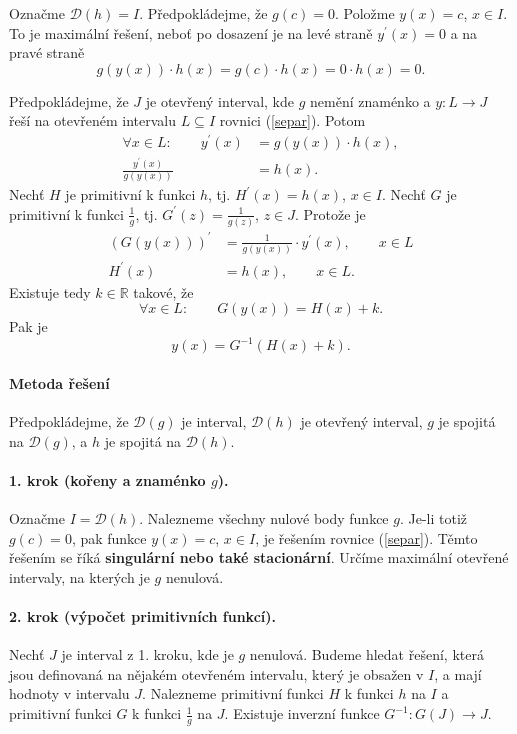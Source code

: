 \begin{pozorovani}
Označme $\mathcal D(h)=I$.
	Předpokládejme, že $g(c)=0$. Položme $y(x)=c$, $x \in I$. To je maximální řešení, neboť
	po dosazení je na levé straně $y^\prime(x)=0$ a na pravé straně
	$$
	    g(y(x))\cdot h(x) = g(c)\cdot h(x) = 0\cdot h(x)=0.
	$$
\end{pozorovani}

\begin{pozorovani}
Předpokládejme, že $J$ je otevřený interval, kde $g$ nemění znaménko a $y: L \to J$ řeší na otevřeném
	intervalu $L\subseteq I$ rovnici (\ref{separ}). Potom
	\begin{align*}
	\forall x \in L: \qquad y^\prime (x) &= g(y(x))\cdot h(x),\\
	\frac{y^\prime(x)}{g(y(x))}&= h(x).
	\end{align*}
	Nechť $H$ je primitivní k funkci $h$, tj. $H^\prime(x) = h(x)$, $x \in I$. Nechť $G$ je primitivní
	k funkci $\frac{1}{g}$, tj. $G^\prime(z)=\frac{1}{g(z)}$, $z\in J$.
	Protože je
	\begin{align*}
	(G(y(x)))^\prime &= \frac{1}{g(y(x))}\cdot y^\prime(x), \qquad x \in L \\
	H^\prime(x)&=h(x), \qquad x \in L.
	\end{align*}
	Existuje tedy $k \in \mathbb R $ takové, že
	$$
	    \forall x \in L: \qquad G(y(x)) = H(x) + k.
	$$
	Pak je
	$$
	    y(x) = G^{-1} (H(x)+k).
	$$
\end{pozorovani}

\paragraph{Metoda řešení}
Předpokládejme, že $\mathcal D(g)$ je interval, $\mathcal D(h)$ je otevřený interval, $g$ je spojitá na
$\mathcal D(g)$, a $h$ je spojitá
na $\mathcal D(h)$.

\paragraph{1. krok (kořeny a znaménko $g$).}
Označme $I=\mathcal D(h)$. Nalezneme všechny nulové body funkce $g$.
Je-li totiž $g(c)=0$, pak funkce $y(x)=c$, $x\in I$, je řešením rovnice (\ref{separ}).
Těmto řešením se říká \textbf{singulární nebo také stacionární}. Určíme maximální otevřené intervaly,
na kterých je $g$ nenulová.

\paragraph{2. krok (výpočet primitivních funkcí).}
Nechť $J$ je interval z 1. kroku, kde je $g$ nenulová.
Budeme hledat řešení, která jsou definovaná na nějakém otevřeném intervalu, který je obsažen
v $I$, a mají hodnoty v intervalu $J$. Nalezneme primitivní funkci $H$ k funkci $h$ na $I$ a primitivní
funkci $G$ k funkci $\frac{1}{g}$ na $J$. Existuje inverzní funkce
$G^{-1}\colon G(J)\to J$.

